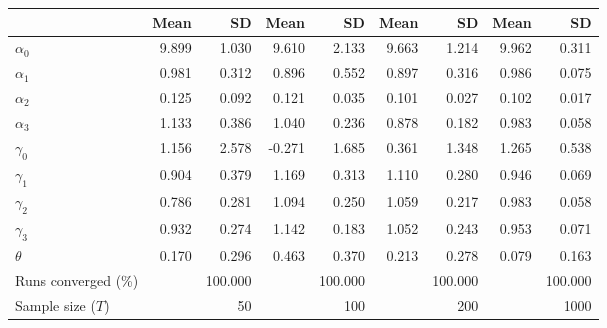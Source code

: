 
\begin{tabular}[t]{lrrrrrrrr}
\toprule
  & Mean & SD & Mean  & SD  & Mean   & SD   & Mean    & SD   \\
\midrule
$\alpha_{0}$ & 9.899 & 1.030 & 9.610 & 2.133 & 9.663 & 1.214 & 9.962 & 0.311\\
$\alpha_{1}$ & 0.981 & 0.312 & 0.896 & 0.552 & 0.897 & 0.316 & 0.986 & 0.075\\
$\alpha_{2}$ & 0.125 & 0.092 & 0.121 & 0.035 & 0.101 & 0.027 & 0.102 & 0.017\\
$\alpha_{3}$ & 1.133 & 0.386 & 1.040 & 0.236 & 0.878 & 0.182 & 0.983 & 0.058\\
$\gamma_{0}$ & 1.156 & 2.578 & -0.271 & 1.685 & 0.361 & 1.348 & 1.265 & 0.538\\
$\gamma_{1}$ & 0.904 & 0.379 & 1.169 & 0.313 & 1.110 & 0.280 & 0.946 & 0.069\\
$\gamma_{2}$ & 0.786 & 0.281 & 1.094 & 0.250 & 1.059 & 0.217 & 0.983 & 0.058\\
$\gamma_{3}$ & 0.932 & 0.274 & 1.142 & 0.183 & 1.052 & 0.243 & 0.953 & 0.071\\
$\theta$ & 0.170 & 0.296 & 0.463 & 0.370 & 0.213 & 0.278 & 0.079 & 0.163\\
Runs converged (\%) &  & 100.000 &  & 100.000 &  & 100.000 &  & 100.000\\
Sample size ($T$) &  & 50 &  & 100 &  & 200 &  & 1000\\
\bottomrule
\end{tabular}

